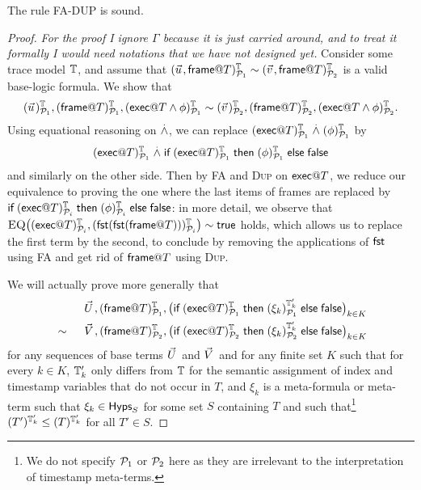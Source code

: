 \begin{proposition}
  The rule \textsc{FA-DUP} is sound.
\end{proposition}
\begin{proof}
  \emph{For the proof I ignore $\Gamma$ because it is just carried around,
  and to treat it formally I would need notations that we have not designed
  yet.}
  Consider some trace model $\mathbb{T}$,
  and assume that
  $(\pvec u,\mframe @ T)^\TM_{\calp_1} \sim
   (\pvec v,\mframe @ T)^\TM_{\calp_2}$
  is a valid base-logic formula.
  We show that
  $$
  \interp{\pvec u}{\TM}{\calp_1},
  \interp{\mframe @ T}{\TM}{\calp_1},
  (\mexec @ T \wedge \phi)^\TM_{\calp_1}
  \sim
  \interp{\pvec v}{\TM}{\calp_2},
  \interp{\mframe @ T}{\TM}{\calp_2},
  (\mexec @ T \wedge \phi)^\TM_{\calp_2}.
  $$
  Using equational reasoning on $\stackrel{.}{\wedge}$, we can replace
  $(\textsf{exec} @ T)^{\mathbb{T}}_{\mathcal{P}_1} \stackrel{.}{\wedge} (\phi)^{\mathbb{T}}_{\mathcal{P}_1}$ by
  $$(\textsf{exec} @ T)^{\mathbb{T}}_{\mathcal{P}_1} \stackrel{.}{\wedge}
  \textsf{if}\; (\textsf{exec} @ T)^{\mathbb{T}}_{\mathcal{P}_1}
  \;\textsf{then}\; (\phi)^{\mathbb{T}}_{\mathcal{P}_1} \;\textsf{else}\; \textsf{false}$$
  and similarly on the other side.
  Then by \textsc{FA} and \textsc{Dup} on $\textsf{exec} @ T$,
  we reduce our equivalence to proving the one where the last items
  of frames are replaced by
  $
  \textsf{if}\; (\textsf{exec} @ T)^{\mathbb{T}}_{\mathcal{P}_i}
  \;\textsf{then}\; (\phi)^{\mathbb{T}}_{\mathcal{P}_i} \;\textsf{else}\; \textsf{false}
  $:
  in more detail, we observe that
  $\textsc{EQ}\bigl((\textsf{exec} @ T)^{\mathbb{T}}_{\mathcal{P}_i},
       (\mathsf{fst}(\mathsf{fst}(\textsf{frame} @ T)))^{\mathbb{T}}_{\mathcal{P}_i}\bigr)\sim\textsf{true}$
  holds, which allows us to replace the first term by the second,
  to conclude by removing the applications of $\mathsf{fst}$ using \textsc{FA}
  and get rid of $\textsf{frame} @ T$ using \textsc{Dup}.

  We will actually prove more generally that
  \begin{alignat*}{2}
      &&&
      \pvec U,
      \interp{\mframe @ T}{\TM}{\calp_1},
      \big(
      \myif \interp{\mexec @ T}{\TM}{\calp_1}
      \mythen \interp{\xi_k}{\TM'_k}{\calp_1} \myelse \false
      \big)_{k \in K}
      \\ &\sim\;\; &&
      \pvec V,
      \interp{\mframe @ T}{\TM}{\calp_2},
      \big(
      \myif \interp{\mexec @ T}{\TM}{\calp_2}
      \mythen \interp{\xi_k}{\TM'_k}{\calp_2} \myelse \false
      \big)_{k \in K}
    \end{alignat*}
  for any sequences of base terms $\pvec U$ and $\pvec V$ and 
  for any finite set $K$ such that for every $k \in K$,
  $\mathbb{T}'_k$ only differs from $\mathbb{T}$ for the semantic
  assignment of index and timestamp variables that do not occur in $T$,
  and $\xi_k$ is a meta-formula or meta-term such that $\xi_k \in \textsf{Hyps}_S$
  for some set $S$ containing $T$ and such that\footnote{
    We do not specify $\mathcal{P}_1$ or $\mathcal{P}_2$ here
    as they are irrelevant to the interpretation of timestamp meta-terms.
  } $(T')^{\mathbb{T}'_k}_{}\leq(T)^{\mathbb{T}'_k}_{}$ for all $T'\in S$.


\end{proof}
